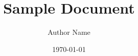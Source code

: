 \documentclass{article}
\title{Sample Document}
\author{Author Name}
\date{\today}
\begin{document}
\maketitle
\lipsum
\end{document}
